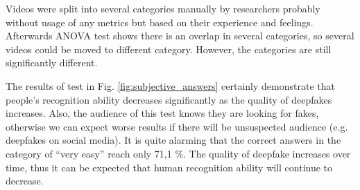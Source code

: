 Videos were split into several categories manually by researchers probably without usage of any metrics but based on their experience and feelings. Afterwards ANOVA test shows there is an overlap in several categories, so several videos could be moved to different category. However, the categories are still significantly different. 

The results of test in Fig. \ref{fig:subjective_answers} certainly demonstrate that people's recognition ability decreases significantly as the quality of deepfakes increases. Also, the audience of this test knows they are looking for fakes, otherwise we can expect worse results if there will be unsuspected audience (e.g. deepfakes on social media). It is quite alarming that the correct answers in the category of “very easy” reach only 71,1 \%. The quality of deepfake increases over time, thus it can be expected that human recognition ability will continue to decrease. \cite{TheThreatOfDeepfakes}

